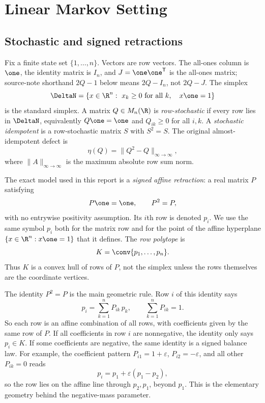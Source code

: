 \section{Linear Markov Setting}
\label{sec:linear-markov-setting}

\subsection{Stochastic and signed retractions}

Fix a finite state set \(\{1,\ldots,n\}\).  Vectors are row vectors.
The all-ones column is \(\one\), the identity matrix is \(I_n\), and
\(J=\one\one^{\mathsf T}\) is the all-ones matrix; source-note shorthand
\(2Q-1\) below means \(2Q-I_n\), not \(2Q-J\).  The simplex
\[
  \DeltaN=\{x\in \R^n:\ x_k\ge 0\ \hbox{for all }k,\quad x\one=1\}
\]
is the standard simplex.  A matrix \(Q\in M_n(\R)\) is
\emph{row-stochastic} if every row lies in \(\DeltaN\), equivalently
\(Q\one=\one\) and \(Q_{ik}\ge 0\) for all \(i,k\).  A
\emph{stochastic idempotent} is a row-stochastic matrix \(S\) with
\(S^2=S\).  The original almost-idempotent defect is
\[
  \eta(Q)=\lVert Q^2-Q\rVert_{\infty\to\infty},
\]
where \(\lVert A\rVert_{\infty\to\infty}\) is the maximum absolute row
sum norm.

The exact model used in this report is a \emph{signed affine
retraction}: a real matrix \(P\) satisfying
\[
  P\one=\one,\qquad P^2=P,
\]
with no entrywise positivity assumption.  Its \(i\)th row is denoted
\(p_i\).  We use the same symbol \(p_i\) both for the matrix row and
for the point of the affine hyperplane \(\{x\in \R^n:x\one=1\}\) that
it defines.  The \emph{row polytope} is
\[
  K=\conv\{p_1,\ldots,p_n\}.
\]
Thus \(K\) is a convex hull of rows of \(P\), not the simplex unless
the rows themselves are the coordinate vertices.

The identity \(P^2=P\) is the main geometric rule.  Row \(i\) of this
identity says
\[
  p_i=\sum_{k=1}^n P_{ik}\,p_k,\qquad \sum_{k=1}^n P_{ik}=1.
\]
So each row is an affine combination of all rows, with coefficients
given by the same row of \(P\).  If all coefficients in row \(i\) are
nonnegative, the identity only says \(p_i\in K\).  If some coefficients
are negative, the same identity is a signed balance law.  For example,
the coefficient pattern \(P_{i1}=1+\varepsilon\),
\(P_{i2}=-\varepsilon\), and all other \(P_{ik}=0\) reads
\[
  p_i=p_1+\varepsilon(p_1-p_2),
\]
so the row lies on the affine line through \(p_2,p_1\), beyond \(p_1\).
This is the elementary geometry behind the negative-mass parameter.


